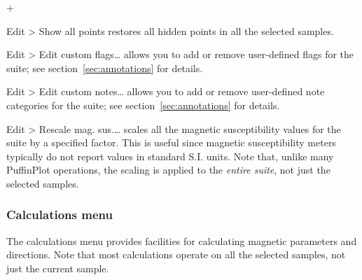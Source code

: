 \documentclass[a4paper,british]{article}
\newcommand{\menuitemlabel}[1]{%
\mbox{\textsf{#1}}\hfil}
\newenvironment{menuitemlist}%
{\begin{list}{}{%
\renewcommand{\makelabel}{\menuitemlabel}%
\setlength{\labelwidth}{35pt}%
\setlength{\leftmargin}%
             {\labelwidth+\labelsep}}}%
{\end{list}}
\newcommand{\submenu}{ \textgreater{} } %
\begin{document}
\begin{menuitemlist}
\item[Edit\submenu Show all points] restores all hidden points in all the
  selected samples.

\item[Edit\submenu Edit custom flags\ldots] allows you to add or remove
  user-defined flags for the suite; see section~\ref{sec:annotations} for
  details.

\item[Edit\submenu Edit custom notes\ldots] allows you to add or remove
  user-defined note categories for the suite; see
  section~\ref{sec:annotations} for details.

\item[Edit\submenu Rescale mag. sus.\ldots] scales all the magnetic
  susceptibility values for the suite by a specified factor. This is useful
  since magnetic susceptibility meters typically do not report values in
  standard S.I. units. Note that, unlike many PuffinPlot operations, the
  scaling is applied to the {\em entire suite}, not just the selected
  samples.

\end{menuitemlist}

\subsubsection{\label{sec:functions-calcs}Calculations menu}

The calculations menu provides facilities for calculating magnetic
parameters and directions. Note that most calculations operate on
all the selected samples, not just the current sample.
\end{document}

